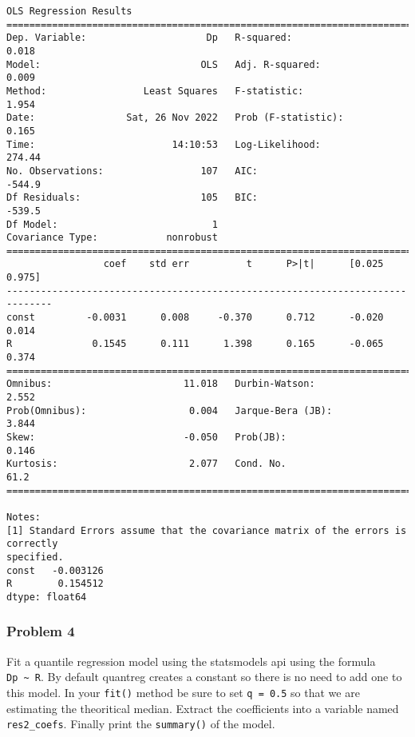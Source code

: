 \documentclass[11pt]{article}
\begin{document}
    \begin{Verbatim}[commandchars=\\\{\}]
                            OLS Regression Results
==============================================================================
Dep. Variable:                     Dp   R-squared:                       0.018
Model:                            OLS   Adj. R-squared:                  0.009
Method:                 Least Squares   F-statistic:                     1.954
Date:                Sat, 26 Nov 2022   Prob (F-statistic):              0.165
Time:                        14:10:53   Log-Likelihood:                 274.44
No. Observations:                 107   AIC:                            -544.9
Df Residuals:                     105   BIC:                            -539.5
Df Model:                           1
Covariance Type:            nonrobust
==============================================================================
                 coef    std err          t      P>|t|      [0.025      0.975]
------------------------------------------------------------------------------
const         -0.0031      0.008     -0.370      0.712      -0.020       0.014
R              0.1545      0.111      1.398      0.165      -0.065       0.374
==============================================================================
Omnibus:                       11.018   Durbin-Watson:                   2.552
Prob(Omnibus):                  0.004   Jarque-Bera (JB):                3.844
Skew:                          -0.050   Prob(JB):                        0.146
Kurtosis:                       2.077   Cond. No.                         61.2
==============================================================================

Notes:
[1] Standard Errors assume that the covariance matrix of the errors is correctly
specified.
const   -0.003126
R        0.154512
dtype: float64
    \end{Verbatim}

    \hypertarget{problem-4}{%
\subsubsection{Problem 4}\label{problem-4}}

Fit a quantile regression model using the statsmodels api using the
formula \texttt{Dp\ \textasciitilde{}\ R}. By default quantreg creates a
constant so there is no need to add one to this model. In your
\texttt{fit()} method be sure to set \texttt{q\ =\ 0.5} so that we are
estimating the theoritical median. Extract the coefficients into a
variable named \texttt{res2\_coefs}. Finally print the
\texttt{summary()} of the model.
\end{document}
